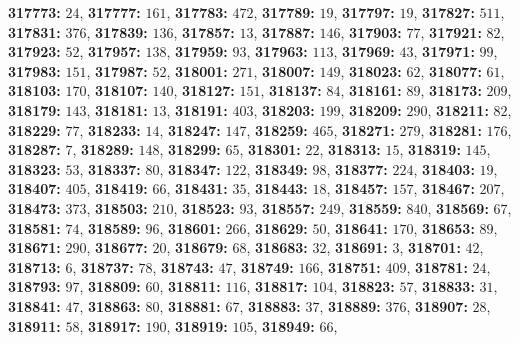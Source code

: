 \textsf{\bfseries 317773:} $24$, \textsf{\bfseries 317777:} $161$, \textsf{\bfseries 317783:} $472$, \textsf{\bfseries 317789:} $19$, \textsf{\bfseries 317797:} $19$, \textsf{\bfseries 317827:} $511$, \textsf{\bfseries 317831:} $376$, \textsf{\bfseries 317839:} $136$, \textsf{\bfseries 317857:} $13$, \textsf{\bfseries 317887:} $146$, \textsf{\bfseries 317903:} $77$, \textsf{\bfseries 317921:} $82$, \textsf{\bfseries 317923:} $52$, \textsf{\bfseries 317957:} $138$, \textsf{\bfseries 317959:} $93$, \textsf{\bfseries 317963:} $113$, \textsf{\bfseries 317969:} $43$, \textsf{\bfseries 317971:} $99$, \textsf{\bfseries 317983:} $151$, \textsf{\bfseries 317987:} $52$, \textsf{\bfseries 318001:} $271$, \textsf{\bfseries 318007:} $149$, \textsf{\bfseries 318023:} $62$, \textsf{\bfseries 318077:} $61$, \textsf{\bfseries 318103:} $170$, \textsf{\bfseries 318107:} $140$, \textsf{\bfseries 318127:} $151$, \textsf{\bfseries 318137:} $84$, \textsf{\bfseries 318161:} $89$, \textsf{\bfseries 318173:} $209$, \textsf{\bfseries 318179:} $143$, \textsf{\bfseries 318181:} $13$, \textsf{\bfseries 318191:} $403$, \textsf{\bfseries 318203:} $199$, \textsf{\bfseries 318209:} $290$, \textsf{\bfseries 318211:} $82$, \textsf{\bfseries 318229:} $77$, \textsf{\bfseries 318233:} $14$, \textsf{\bfseries 318247:} $147$, \textsf{\bfseries 318259:} $465$, \textsf{\bfseries 318271:} $279$, \textsf{\bfseries 318281:} $176$, \textsf{\bfseries 318287:} $7$, \textsf{\bfseries 318289:} $148$, \textsf{\bfseries 318299:} $65$, \textsf{\bfseries 318301:} $22$, \textsf{\bfseries 318313:} $15$, \textsf{\bfseries 318319:} $145$, \textsf{\bfseries 318323:} $53$, \textsf{\bfseries 318337:} $80$, \textsf{\bfseries 318347:} $122$, \textsf{\bfseries 318349:} $98$, \textsf{\bfseries 318377:} $224$, \textsf{\bfseries 318403:} $19$, \textsf{\bfseries 318407:} $405$, \textsf{\bfseries 318419:} $66$, \textsf{\bfseries 318431:} $35$, \textsf{\bfseries 318443:} $18$, \textsf{\bfseries 318457:} $157$, \textsf{\bfseries 318467:} $207$, \textsf{\bfseries 318473:} $373$, \textsf{\bfseries 318503:} $210$, \textsf{\bfseries 318523:} $93$, \textsf{\bfseries 318557:} $249$, \textsf{\bfseries 318559:} $840$, \textsf{\bfseries 318569:} $67$, \textsf{\bfseries 318581:} $74$, \textsf{\bfseries 318589:} $96$, \textsf{\bfseries 318601:} $266$, \textsf{\bfseries 318629:} $50$, \textsf{\bfseries 318641:} $170$, \textsf{\bfseries 318653:} $89$, \textsf{\bfseries 318671:} $290$, \textsf{\bfseries 318677:} $20$, \textsf{\bfseries 318679:} $68$, \textsf{\bfseries 318683:} $32$, \textsf{\bfseries 318691:} $3$, \textsf{\bfseries 318701:} $42$, \textsf{\bfseries 318713:} $6$, \textsf{\bfseries 318737:} $78$, \textsf{\bfseries 318743:} $47$, \textsf{\bfseries 318749:} $166$, \textsf{\bfseries 318751:} $409$, \textsf{\bfseries 318781:} $24$, \textsf{\bfseries 318793:} $97$, \textsf{\bfseries 318809:} $60$, \textsf{\bfseries 318811:} $116$, \textsf{\bfseries 318817:} $104$, \textsf{\bfseries 318823:} $57$, \textsf{\bfseries 318833:} $31$, \textsf{\bfseries 318841:} $47$, \textsf{\bfseries 318863:} $80$, \textsf{\bfseries 318881:} $67$, \textsf{\bfseries 318883:} $37$, \textsf{\bfseries 318889:} $376$, \textsf{\bfseries 318907:} $28$, \textsf{\bfseries 318911:} $58$, \textsf{\bfseries 318917:} $190$, \textsf{\bfseries 318919:} $105$, \textsf{\bfseries 318949:} $66$, 
